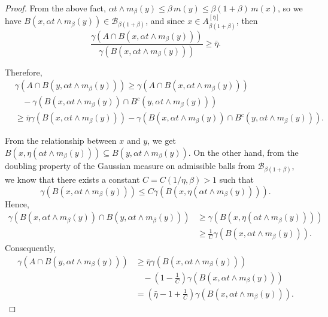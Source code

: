 \documentclass[leqno,11pt]{amsart}
\theoremstyle{plain}
\theoremstyle{remark}
\begin{document}
{{{\begin{proof}
From the above fact, $\alpha t\wedge m_\beta(y) \leq \beta\,  m(y)\leq \beta (1+\beta)\,  m(x)$, so we have $B(x,\alpha t\wedge m_\beta(y))\in \mathscr{B}_{\beta (1+\beta)}$, and since $x\in A^{[\bar{\eta}]}_{\beta (1+\beta)}$, then 
\[\frac{\gamma(A\cap B(x,\alpha t\wedge m_\beta(y)))}{\gamma(B(x,\alpha t\wedge m_\beta(y)))}\geq \bar{\eta}.\]

Therefore,
\begin{align*}
  &\gamma(A\cap B(y,\alpha t\wedge m_\beta(y)))\geq \gamma(A\cap B(x,\alpha t\wedge m_\beta(y)))\\ &\ \ \ \ -\gamma(B(x,\alpha t\wedge m_\beta(y))\cap B^c(y,\alpha t\wedge m_\beta(y)))\\
  &\geq \bar{\eta} \gamma(B(x,\alpha t\wedge m_\beta(y)))-\gamma(B(x,\alpha t\wedge m_\beta(y))\cap B^c(y,\alpha t\wedge m_\beta(y))).
\end{align*}

From the relationship between $x$ and $y$, we get $B(x,\eta (\alpha t\wedge m_\beta(y)))\subseteq B(y,\alpha t\wedge m_\beta(y))$. On the other hand, from the doubling property of the Gaussian measure on admissible balls from $\mathscr{B}_{\beta (1+\beta)}$, we know that there exists a constant $C=C(1/\eta, \beta)>1$ such that
\[\gamma(B(x,\alpha t\wedge m_\beta(y)))\leq C \gamma(B(x,\eta (\alpha  t\wedge m_\beta(y)))).\]
Hence,
\begin{align*}
\gamma(B(x,\alpha t\wedge m_\beta(y))\cap B(y,\alpha t\wedge m_\beta(y)))&\geq \gamma(B(x,\eta (\alpha t\wedge m_\beta(y))))\\ &\geq \frac{1}{C}\gamma(B(x, \alpha t\wedge m_\beta(y))).\end{align*}
Consequently, 
\begin{align}\label{eq: gamma de F intersec la bola}
  \nonumber \gamma(A\cap B(y,\alpha t\wedge m_\beta(y)))&\geq \bar{\eta} \gamma(B(x,\alpha t\wedge m_\beta(y))) \nonumber \\ &\ \ \ \ -\left(1-\frac{1}{C}\right)\gamma(B(x,\alpha t\wedge m_\beta(y)))\nonumber\\
  &=\left(\bar{\eta}-1+\frac{1}{C}\right)\gamma(B(x,\alpha t\wedge m_\beta(y))).
\end{align}


\end{proof}}}}
\end{document}
